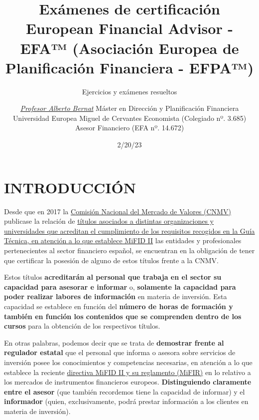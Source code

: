 \documentclass[
  letterpaper,
  DIV=11,
  numbers=noendperiod]{scrreprt}
\title{Exámenes de certificación European Financial Advisor - EFA™
(Asociación Europea de Planificación Financiera - EFPA™)}
\subtitle{Ejercicios y exámenes resueltos}
\author{\href{https://www.linkedin.com/in/albertobernat/}{\emph{Profesor
Alberto Bernat}} Máster en Dirección y Planificación Financiera
Universidad Europea Miguel de Cervantes Economista (Colegiado nº. 3.685)
Asesor Financiero (EFA nº. 14.672)}
\date{2/20/23}
\renewcommand*\contentsname{Table of contents}
\newcommand\contentsname{Table of contents}
\begin{document}
\maketitle
\ifdefined\Shaded\renewenvironment{Shaded}{\begin{tcolorbox}[sharp corners, interior hidden, boxrule=0pt, borderline west={3pt}{0pt}{shadecolor}, breakable, frame hidden, enhanced]}{\end{tcolorbox}}\fi

\renewcommand*\contentsname{Table of contents}
{
\hypersetup{linkcolor=}
\setcounter{tocdepth}{2}
\tableofcontents
}

\hypertarget{introducciuxf3n}{%
\chapter*{INTRODUCCIÓN}\label{introducciuxf3n}}


Desde que en 2017 la
\href{https://www.cnmv.es/portal/home.aspx}{Comisión Nacional del
Mercado de Valores (CNMV)} publicase la relación de
\href{http://cnmv.es/Docportal/Legislacion/Titulos/ListadoTitulos.pdf}{títulos
asociados a distintas organizaciones y universidades que acreditan el
cumplimiento de los requisitos recogidos en la Guía Técnica, en atención
a lo que establece MiFID II} las entidades y profesionales
pertenecientes al sector financiero español, se encuentran en la
obligación de tener que certificar la posesión de alguno de estos
títulos frente a la CNMV.

Estos títulos \textbf{acreditarán al personal que trabaja en el sector
su capacidad para asesorar e informar} o, \textbf{solamente la capacidad
para poder realizar labores de información} en materia de inversión.
Esta capacidad se establece en función del \textbf{número de horas de
formación y también en función los contenidos que se comprenden dentro
de los cursos} para la obtención de los respectivos títulos.

En otras palabras, podemos decir que se trata de \textbf{demostrar
frente al regulador estatal} que el personal que informa o asesora sobre
servicios de inversión posee los conocimientos y competencias
necesarias, en atención a lo que establece la reciente
\href{http://cnmv.es/portal/MIFIDII_MIFIR/MapaMiFID.aspx}{directiva
MiFID II y su reglamento (MiFIR)} en lo relativo a los mercados de
instrumentos financieros europeos. \textbf{Distinguiendo claramente
entre el asesor} (que también recordemos tiene la capacidad de informar)
y el \textbf{informador} (quien, exclusivamente, podrá prestar
información a los clientes en materia de inversión).
\end{document}
